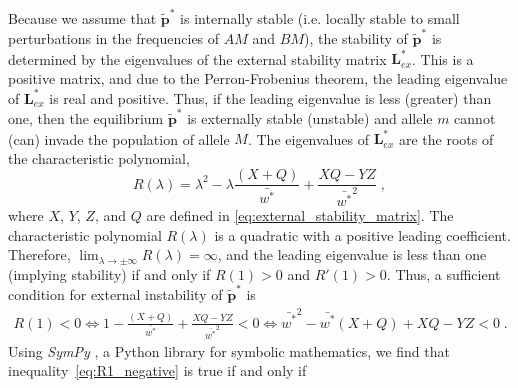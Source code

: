 \documentclass[12pt]{extarticle}
\let\vec\mathbf
\begin{document}
\begin{appendices}
Because we assume that $\vec{\tilde{p}^*}$ is internally stable (i.e. locally stable to small perturbations in the frequencies of $AM$ and $BM$), the stability of 
$\vec{\tilde{p}^*}$ is determined by the eigenvalues of the external stability matrix $\vec{L}^*_{ex}$.
This is a positive matrix, and due to the Perron-Frobenius theorem, the leading eigenvalue of $\mathbf{L}^*_{ex}$ is real and positive.
Thus, if the leading eigenvalue is less (greater) than one, then the equilibrium $\vec{\tilde{p}^*}$ is externally stable (unstable) and allele $m$ cannot (can) invade the population of allele $M$. 
The eigenvalues of $\mathbf{L}^*_{ex}$ are the roots of the characteristic polynomial, 
\begin{equation}\label{char_poly}
R(\lambda) = 
\lambda^2 -\lambda \frac{(X+Q)}{\bar{w^*}} + \frac{XQ - YZ}{\bar{w^*}^2} \;,
\end{equation}
where $X$, $Y$, $Z$, and $Q$ are defined in \autoref{eq:external_stability_matrix}.
The characteristic polynomial $R(\lambda)$ is a quadratic with a positive leading coefficient. Therefore, $\lim_{\lambda \to \pm \infty} R(\lambda) = \infty$, and the leading eigenvalue is less than one (implying stability) if and only if $R(1)>0$ and $R'(1)>0$.
Thus, a sufficient condition for external instability of $\vec{\tilde{p}^*}$ is
\begin{equation} \label{eq:R1_negative}
\begin{aligned}
R(1) < 0 \Leftrightarrow 
1 - \frac{(X+Q)}{\bar{w^*}} + \frac{XQ - YZ}{\bar{w^*}^2} < 0 \Leftrightarrow 
\bar{w^*}^2 - \bar{w^*} (X+Q) + XQ - YZ < 0 \;.
\end{aligned}
\end{equation}
Using \emph{SymPy} \citep{Meurer2017}, a Python library for symbolic mathematics, we find that inequality~\ref{eq:R1_negative} is true if and only if
\begin{equation} \label{eq:alpha2_alpha1_intermediate}
\begin{aligned}

\end{aligned}
\end{equation}
\end{appendices}
\end{document}
